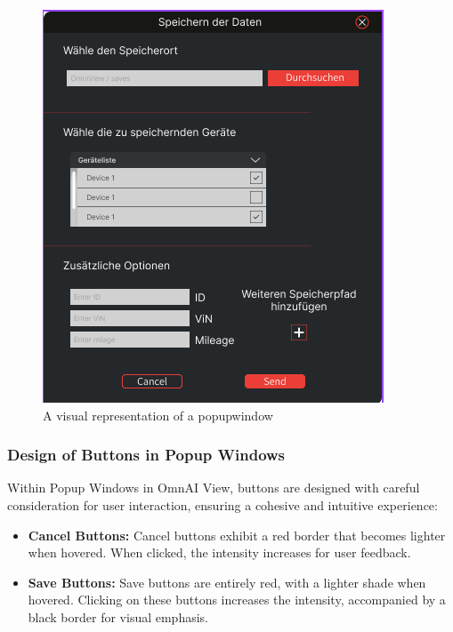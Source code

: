 \documentclass[]{scrreprt}
\begin{document}
\begin{itemize}
\begin{figure}
    \includegraphics[width=.9\textwidth]{assets/pictures/Popupwindow_png.png}
    \caption[]{A visual representation of a popupwindow}
    \label{fig:popupwindow}
    \end{figure}




\subsubsection{Design of Buttons in Popup Windows}\label{cap:Designprinciples_PopupButtons}


Within Popup Windows in OmnAI View, buttons are designed with careful consideration for user interaction, ensuring a cohesive and intuitive experience:


\begin{itemize}
    \item \textbf{Cancel Buttons:} Cancel buttons exhibit a red border that becomes lighter when hovered. When clicked, the intensity increases for user feedback.
   
    \item \textbf{Save Buttons:} Save buttons are entirely red, with a lighter shade when hovered. Clicking on these buttons increases the intensity, accompanied by a black border for visual emphasis.
   

\end{itemize}
\end{itemize}
\end{document}
